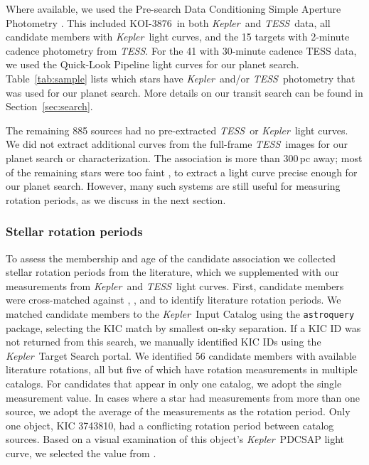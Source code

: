 \documentclass[twocolumn, linenumbers]{aastex631}
\newcommand{\starname}{KOI-3876}
\newcommand{\kepler}{{\it Kepler}}
\newcommand{\tess}{\textit{TESS}}
\begin{document}
Where available, we used the Pre-search Data Conditioning Simple Aperture Photometry \citep[PDCSAP;][]{Stumpe2012, Smith2012}. This included \starname\ in both \kepler\ and \tess\ data, all candidate members with \kepler\ light curves, and the 15 targets with 2-minute cadence photometry from \tess. For the 41 with 30-minute cadence TESS data, we used the Quick-Look Pipeline light curves \citep{2020RNAAS...4..204H} for our planet search. Table~\ref{tab:sample} lists which stars have \kepler\ and/or \tess\ photometry that was used for our planet search. More details on our transit search can be found in Section~\ref{sec:search}.

The remaining 885 sources had no pre-extracted \tess\ or \kepler\ light curves. We did not extract additional curves from the full-frame \tess\ images for our planet search or characterization. The association is more than 300\,pc away; most of the remaining stars were too faint \citep[QLP limit of $T<13.5$][]{2020RNAAS...4..204H}, to extract a light curve precise enough for our planet search. However, many such systems are still useful for measuring rotation periods, as we discuss in the next section.


\subsubsection{Stellar rotation periods}\label{sub:rot_collection}

To assess the membership and age of the candidate association we collected stellar rotation periods from the literature, which we supplemented with our measurements from \kepler\ and \tess\ light curves. First, candidate members were cross-matched against \citet{Nielsen:2013}, \citet{McQuillan2013, 2014ApJS..211...24M}, and \citet{Santos2019, Santos2021} to identify literature rotation periods. We matched candidate members to the \kepler\ Input Catalog \citep[KIC;][]{Brown2011} using the \texttt{astroquery} package, selecting the KIC match by smallest on-sky separation. If a KIC ID was not returned from this search, we manually identified KIC IDs using the \kepler\ Target Search portal. We identified $56$ candidate members with available literature rotations, all but five of which have rotation measurements in multiple catalogs. For candidates that appear in only one catalog, we adopt the single measurement value. In cases where a star had measurements from more than one source, we adopt the average of the measurements as the rotation period. Only one object, KIC 3743810, had a conflicting rotation period between catalog sources. Based on a visual examination of this object's \kepler\ PDCSAP light curve, we selected the value from \citet{Nielsen:2013}.
\end{document}
